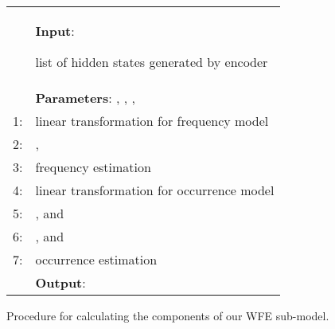 \documentclass[11pt]{article}
\begin{document}
\begin{figure}[t]
 \centering
 \tabcolsep=1pt
 \small
 \begin{tabular}{rp{71mm}}
  \hline
  \ &\hspace{-1.2em}\textbf{Input}:
  
  \hspace{\fill}
   {\scriptsize list of hidden states generated by encoder}
  \\
  \ &\hspace{-1.2em}\textbf{Parameters}:
      ,
      ,
      ,
      \\
1:&\hspace{0.0em}
      
      \hspace{\fill}
       {\scriptsize linear transformation for frequency model}
      \\
2:&\hspace{0.0em}
      
      \hspace{\fill}
       {\scriptsize , }
      \\
3:&\hspace{0.0em}
      
      \hspace{\fill}
       {\scriptsize frequency estimation}
      \\
4:&\hspace{0.0em}
      
      \hspace{\fill}
       {\scriptsize linear transformation for occurrence model}
      \\
5:&\hspace{0.0em}
      
      \hspace{\fill}
       {\scriptsize , and }
      \\
6:&\hspace{0.0em}
      
      \hspace{\fill}
       {\scriptsize , and }
      \\
7:&\hspace{0.0em}
      
      \hspace{\fill}
       {\scriptsize  occurrence estimation}
      \\
\  &\hspace{-1.2em}\textbf{Output}: 
      \\
  \hline
 \end{tabular}
 \caption{Procedure for calculating the components of our WFE sub-model.}
 \label{fig:wfe_calculation}
\end{figure}
\end{document}
